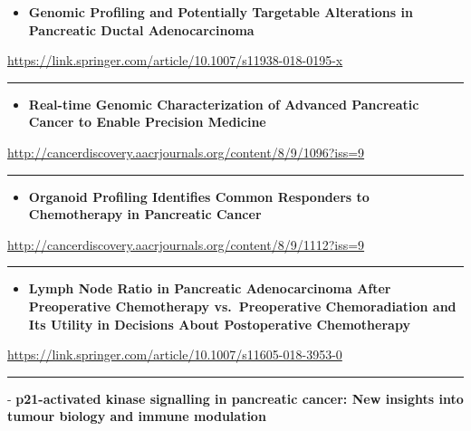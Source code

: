 \documentclass[]{article}
\providecommand{\tightlist}{%
  \setlength{\itemsep}{0pt}\setlength{\parskip}{0pt}}
\begin{document}
\begin{itemize}
\tightlist
\item
  \textbf{Genomic Profiling and Potentially Targetable Alterations in
  Pancreatic Ductal Adenocarcinoma}
\end{itemize}

\url{https://link.springer.com/article/10.1007/s11938-018-0195-x}

\begin{center}\rule{0.5\linewidth}{\linethickness}\end{center}

\begin{itemize}
\tightlist
\item
  \textbf{Real-time Genomic Characterization of Advanced Pancreatic
  Cancer to Enable Precision Medicine}
\end{itemize}

\url{http://cancerdiscovery.aacrjournals.org/content/8/9/1096?iss=9}

\begin{center}\rule{0.5\linewidth}{\linethickness}\end{center}

\begin{itemize}
\tightlist
\item
  \textbf{Organoid Profiling Identifies Common Responders to
  Chemotherapy in Pancreatic Cancer}
\end{itemize}

\url{http://cancerdiscovery.aacrjournals.org/content/8/9/1112?iss=9}

\begin{center}\rule{0.5\linewidth}{\linethickness}\end{center}

\begin{itemize}
\tightlist
\item
  \textbf{Lymph Node Ratio in Pancreatic Adenocarcinoma After
  Preoperative Chemotherapy vs.~Preoperative Chemoradiation and Its
  Utility in Decisions About Postoperative Chemotherapy}
\end{itemize}

\url{https://link.springer.com/article/10.1007/s11605-018-3953-0}

\begin{center}\rule{0.5\linewidth}{\linethickness}\end{center}

 - \textbf{p21-activated kinase signalling in pancreatic cancer: New
insights into tumour biology and immune modulation}
\end{document}
